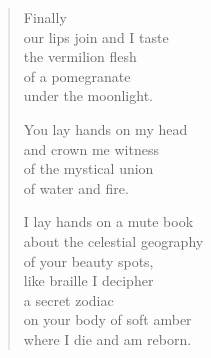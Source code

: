 \documentclass[twocolumn,12pt]{article}
\begin{document}
\begin{verse}
  Finally \\
  our lips join and I taste \\
  the vermilion flesh\\
  of a pomegranate \\
  under the moonlight.

  You lay hands on my head \\
  and crown me witness \\
  of the mystical union \\
  of water and fire.

  I lay hands on a mute book \\
  about the celestial geography \\
  of your beauty spots, \\
  like braille I decipher \\
  a secret zodiac \\
  on your body of soft amber \\
  where I die and am reborn.
\end{verse}
\end{document}
